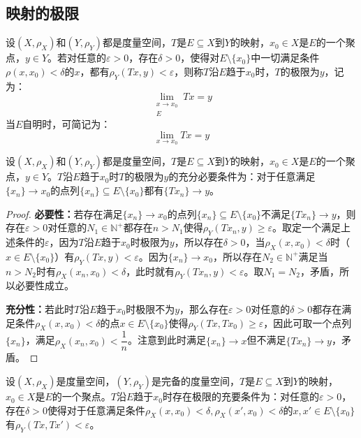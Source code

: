 \subsection{映射的极限}
\begin{definition}
	设$(X,\rho_X)$和$(Y,\rho_Y)$都是度量空间，$T$是$E\subseteq X$到$Y$的映射，$x_0\in X$是$E$的一个聚点，$y\in Y$。若对任意的$\varepsilon>0$，存在$\delta>0$，使得对$E\setminus\{x_0\}$中一切满足条件$\rho(x,x_0)<\delta$的$x$，都有$\rho_Y(Tx,y)<\varepsilon$，则称$T$沿$E$趋于$x_0$时，$T$的极限为$y$，记为：
	\begin{equation*}
		\lim_{\substack{x\to x_0 \\ E}}Tx=y
	\end{equation*}
	当$E$自明时，可简记为：
	\begin{equation*}
		\lim_{x\to x_0}Tx=y
	\end{equation*}
\end{definition}
\begin{theorem}\label{theo:SequentialCharacterizationOfFunctionLimits}
	设$(X,\rho_X)$和$(Y,\rho_Y)$都是度量空间，$T$是$E\subseteq X$到$Y$的映射，$x_0\in X$是$E$的一个聚点，$y\in Y$。$T$沿$E$趋于$x_0$时$T$的极限为$y$的充分必要条件为：对于任意满足$\{x_n\}\to x_0$的点列$\{x_n\}\subseteq E\setminus\{x_0\}$都有$\{Tx_n\}\to y$。
\end{theorem}
\begin{proof}
	\textbf{必要性：}若存在满足$\{x_n\}\to x_0$的点列$\{x_n\}\subseteq E\setminus\{x_0\}$不满足$\{Tx_n\}\to y$，则存在$\varepsilon>0$对任意的$N_1\in\mathbb{N}^+$都存在$n>N_1$使得$\rho_Y(Tx_n,y)\geqslant\varepsilon$。取定一个满足上述条件的$\varepsilon$，因为$T$沿$E$趋于$x_0$时极限为$y$，所以存在$\delta>0$，当$\rho_X(x,x_0)<\delta$时（$x\in E\setminus\{x_0\}$）有$\rho_Y(Tx,y)<\varepsilon$。因为$\{x_n\}\to x_0$，所以存在$N_2\in\mathbb{N}^+$满足当$n>N_2$时有$\rho_X(x_n,x_0)<\delta$，此时就有$\rho_Y(Tx_n,y)<\varepsilon$。取$N_1=N_2$，矛盾，所以必要性成立。\par
	\textbf{充分性：}若此时$T$沿$E$趋于$x_0$时极限不为$y$，那么存在$\varepsilon>0$对任意的$\delta>0$都存在满足条件$\rho_X(x,x_0)<\delta$的点$x\in E\setminus\{x_0\}$使得$\rho_Y(Tx,Tx_0)\geqslant\varepsilon$，因此可取一个点列$\{x_n\}$，满足$\rho_X(x_n,x_0)<\dfrac{1}{n}$。注意到此时满足$\{x_n\}\to x$但不满足$\{Tx_n\}\to y$，矛盾。
\end{proof}
\begin{theorem}\label{theo:Cauchy-TypeConditionForFunctionLimits}
	设$(X,\rho_X)$是度量空间，$(Y,\rho_Y)$是完备的度量空间，$T$是$E\subseteq X$到$Y$的映射，$x_0\in X$是$E$的一个聚点。$T$沿$E$趋于$x_0$时存在极限的充要条件为：对任意的$\varepsilon>0$，存在$\delta>0$使得对于任意满足条件$\rho_X(x,x_0)<\delta,\rho_X(x',x_0)<\delta$的$x,x'\in E\setminus\{x_0\}$有$\rho_Y(Tx,Tx')<\varepsilon$。
\end{theorem}
